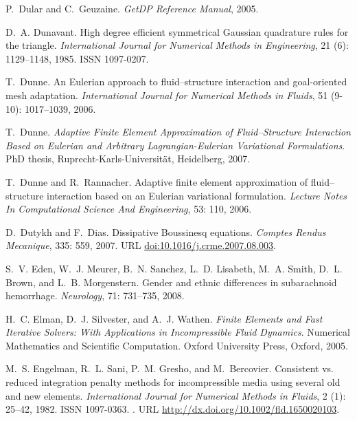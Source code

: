 \begin{thebibliography}{467}
P.~Dular and C.~Geuzaine.
\newblock \emph{{G}et{DP} Reference Manual}, 2005.

D.~A. Dunavant.
\newblock High degree efficient symmetrical {G}aussian quadrature rules for the
  triangle.
\newblock \emph{International Journal for Numerical Methods in Engineering},
  21 (6): 1129--1148, 1985.
\newblock ISSN 1097-0207.

T.~Dunne.
\newblock An {E}ulerian approach to fluid--structure interaction and
  goal-oriented mesh adaptation.
\newblock \emph{International Journal for Numerical Methods in Fluids},
  51 (9-10): 1017--1039, 2006.

T.~Dunne.
\newblock \emph{Adaptive Finite Element Approximation of Fluid--Structure
  Interaction Based on {E}ulerian and Arbitrary {L}agrangian-{E}ulerian
  Variational Formulations}.
\newblock PhD thesis, Ruprecht-Karls-Universität, Heidelberg, 2007.

T.~Dunne and R.~Rannacher.
\newblock Adaptive finite element approximation of fluid--structure interaction
  based on an {E}ulerian variational formulation.
\newblock \emph{Lecture Notes In Computational Science And Engineering},
  53: 110, 2006.

D.~Dutykh and F.~Dias.
\newblock Dissipative {B}oussinesq equations.
\newblock \emph{Comptes Rendus Mecanique}, 335: 559, 2007.
\newblock URL \url{doi:10.1016/j.crme.2007.08.003}.

S.~V. Eden, W.~J. Meurer, B.~N. Sanchez, L.~D. Lisabeth, M.~A. Smith, D.~L.
  Brown, and L.~B. Morgenstern.
\newblock Gender and ethnic differences in subarachnoid hemorrhage.
\newblock \emph{Neurology}, 71: 731--735, 2008.

H.~C. Elman, D.~J. Silvester, and A.~J. Wathen.
\newblock \emph{Finite Elements and Fast Iterative Solvers: With Applications
  in Incompressible Fluid Dynamics}.
\newblock Numerical Mathematics and Scientific Computation. Oxford University
  Press, Oxford, 2005.

M.~S. Engelman, R.~L. Sani, P.~M. Gresho, and M.~Bercovier.
\newblock Consistent vs. reduced integration penalty methods for incompressible
  media using several old and new elements.
\newblock \emph{International Journal for Numerical Methods in Fluids},
  2 (1): 25--42, 1982.
\newblock ISSN 1097-0363.
\newblock {}.
\newblock URL \url{http://dx.doi.org/10.1002/fld.1650020103}.


\end{thebibliography}
